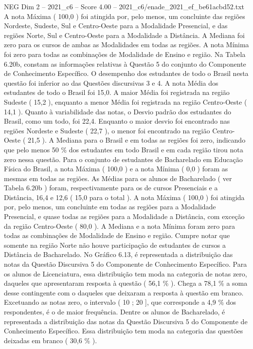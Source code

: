 \begin{textsample}{NEG Dim 2 – 2021\_c6 – Score 4.00 – 2021\_c6/enade\_2021\_ef\_be61acbd52.txt}
A nota Máxima ( 100,0 ) foi atingida por, pelo menos, um concluinte das regiões Nordeste, Sudeste, Sul e Centro-Oeste para a Modalidade Presencial, e das regiões Norte, Sul e Centro-Oeste para a Modalidade a Distância.
A Mediana foi zero para os cursos de ambas as Modalidades em todas as regiões.
A nota Mínima foi zero para todas as combinações de Modalidade de Ensino e região.
Na Tabela 6.20b, constam as informações relativas à Questão 5 do conjunto do Componente de Conhecimento Específico.
O desempenho dos estudantes de todo o Brasil nesta questão foi inferior ao das Questões discursivas 3 e 4.
A nota Média dos estudantes de todo o Brasil foi 15,0.
A maior Média foi registrada na região Sudeste ( 15,2 ), enquanto a menor Média foi registrada na região Centro-Oeste ( 14,1 ).
Quanto à variabilidade das notas, o Desvio padrão dos estudantes do Brasil, como um todo, foi 22,4.
Enquanto o maior desvio foi encontrado nas regiões Nordeste e Sudeste ( 22,7 ), o menor foi encontrado na região Centro-Oeste ( 21,5 ).
A Mediana para o Brasil e em todas as regiões foi zero, indicando que pelo menos 50 \% dos estudantes em todo Brasil e em cada região tirou nota zero nessa questão.
Para o conjunto de estudantes de Bacharelado em Educação Física do Brasil, a nota Máxima ( 100,0 ) e a nota Mínima ( 0,0 ) foram as mesmas em todas as regiões.
As Médias para os alunos de Bacharelado ( ver Tabela 6.20b ) foram, respectivamente para os de cursos Presenciais e a Distância, 16,4 e 12,6 ( 15,0 para o total ).
A nota Máxima ( 100,0 ) foi atingida por, pelo menos, um concluinte em todas as regiões para a Modalidade Presencial, e quase todas as regiões para a Modalidade a Distância, com exceção da região Centro-Oeste ( 80,0 ).
A Mediana e a nota Mínima foram zero para todas as combinações de Modalidade de Ensino e região.
Cumpre notar que somente na região Norte não houve participação de estudantes de cursos a Distância de Bacharelado.
No Gráfico 6.13, é representada a distribuição das notas da Questão Discursiva 5 do Componente de Conhecimento Específico.
Para os alunos de Licenciatura, essa distribuição tem moda na categoria de notas zero, daqueles que apresentaram resposta à questão ( 56,1 \% ).
Chega a 78,1 \% a soma desse contingente com o daqueles que deixaram a resposta à questão em branco.
Excetuando as notas zero, o intervalo ( 10 ; 20 ], que corresponde a 4,9 \% dos respondentes, é o de maior frequência.
Dentre os alunos de Bacharelado, é representada a distribuição das notas da Questão Discursiva 5 do Componente de Conhecimento Específico.
Essa distribuição tem moda na categoria das questões deixadas em branco ( 30,6 \% ).

\end{textsample}
